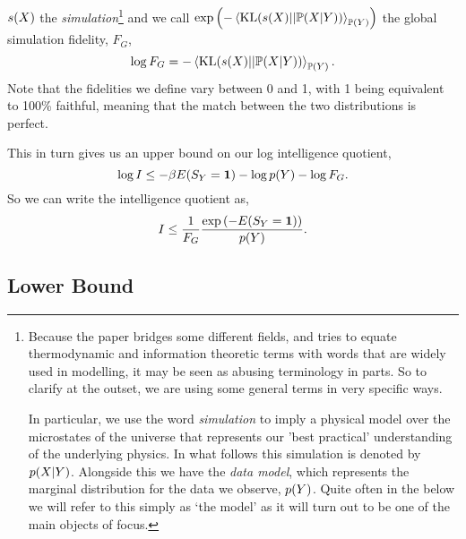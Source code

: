 \documentclass[]{article}
\begin{document}
$s(X)$ the \emph{simulation}\footnote{Because the paper bridges some different fields, and tries to equate
thermodynamic and information theoretic terms with words that are
widely used in modelling, it may be seen as abusing terminology in
parts. So to clarify at the outset, we are using some general terms in
very specific ways.

In particular, we use the word \emph{simulation} to imply a physical
model over the microstates of the universe that represents our 'best
practical' understanding of the underlying physics. In what follows
this simulation is denoted by
$p(X|Y)$. Alongside this we have
the \emph{data model}, which represents the marginal distribution for
the data we observe, $p(Y)$. Quite often in
the below we will refer to this simply as `the model' as it will turn
out to be one of the main objects of focus.
} and we call
$\exp\left(-
\left\langle \text{KL}(s(X)||\mathbb{P}(X|Y)) \right\rangle_{\mathbb{P}(Y)}\right)$
the global simulation fidelity, $F_G$,
\[
\log F_G =
-\left\langle \text{KL}(s(X)||\mathbb{P}(X|Y)) \right\rangle_{\mathbb{P}(Y)}.
\]
Note that the fidelities we define vary between 0 and 1, with 1 being
equivalent to 100\% faithful, meaning that the match between the two
distributions is perfect.

This in turn gives us an upper bound on our log intelligence quotient,
\[
\log I \leq -\beta E(S_Y = \textbf{1})
-\log p(Y) - \log F_G.
\]
So we can write the intelligence quotient as,
\[
I \leq
\frac{1}{F_G}\frac{\exp\left(-E(S_Y=\textbf{1})\right)}{p(Y)}.
\]

\subsection{Lower Bound}
\end{document}
